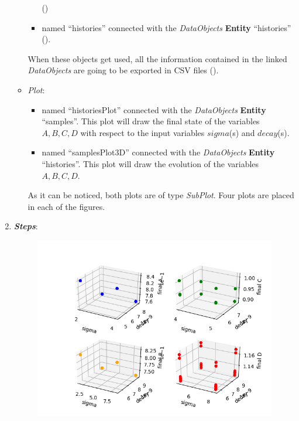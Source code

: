 \begin{enumerate}
\begin{itemize}
\begin{itemize}
                ()
       \item named ``histories'' connected with the \textit{DataObjects} \textbf{Entity} ``histories'' ().
     \end{itemize}
      When these objects get used, all the information contained in the
      linked  \textit{DataObjects} are going
    to be exported in CSV files ().
    \item \textit{Plot}:
    \begin{itemize}
      \item named ``historiesPlot'' connected with the  \textit{DataObjects}
      \textbf{Entity} ``samples''.  This plot will draw the final state of the
      variables $A,B,C,D$ with respect to the input variables $sigma$(s)
      and $decay$(s).
      \item named ``samplesPlot3D'' connected with the
      \textit{DataObjects} \textbf{Entity} ``histories''. This plot will draw the
      evolution of the variables $A,B,C,D$.
    \end{itemize}
     As it can be noticed, both plots are of type \textit{SubPlot}. Four plots
     are placed in each of the figures.
  \end{itemize}
   \item \textbf{\textit{Steps}}:
 \begin{figure}[h!]
  \centering
  \includegraphics[scale=0.7]{../../tests/framework/user_guide/ForwardSamplingStrategies/gold/RunDir/Grid/1-samplesPlot3D_scatter-scatter-scatter-scatter.png}

\end{figure}
\end{enumerate}
